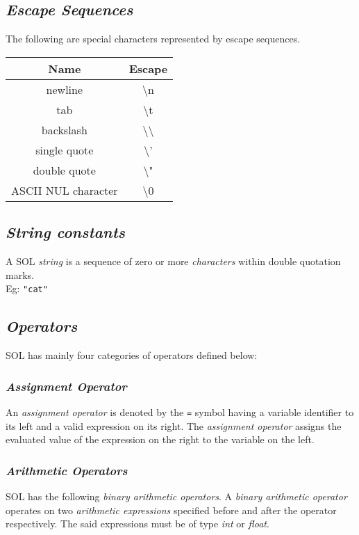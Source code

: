 \documentclass[letterpaper,12pt]{article}
\begin{document}
    \subsection{\textit{Escape Sequences}}
    The following are special characters represented by escape sequences.
        \begin{center}
            \begin{tabular}{ |c|c| }
            \hline
                \textbf{Name}   & \textbf{Escape}\\
                \hline
                newline         & \textbackslash n\\
                tab             & \textbackslash t\\
                backslash       & \textbackslash \textbackslash\\
                single quote    & \textbackslash '\\
                double quote    & \textbackslash "\\
                ASCII NUL character & \textbackslash 0\\
            \hline
            \end{tabular}
        \end{center}

    \subsection{\textit{String constants}}
    A SOL \textit{string} is a sequence of zero or more \textit{characters} within double quotation marks.\\
    Eg: \texttt{"cat"}

	\subsection{\textit{Operators}}
    SOL has mainly four categories of operators defined below:

        \subsubsection{\textit{Assignment Operator}}
        An \textit{assignment operator} is denoted by the \texttt{=} symbol having a variable identifier to its left and a valid expression on its right. The \textit{assignment operator} assigns the evaluated value of the expression on the right to the variable on the left.

        \subsubsection{\textit{Arithmetic Operators}}
        SOL has the following \textit{binary arithmetic operators}. A \textit{binary arithmetic operator} operates on two \textit{arithmetic expressions} specified before and after the operator respectively. The said expressions must be of type \textit{int} or \textit{float}.
\end{document}
